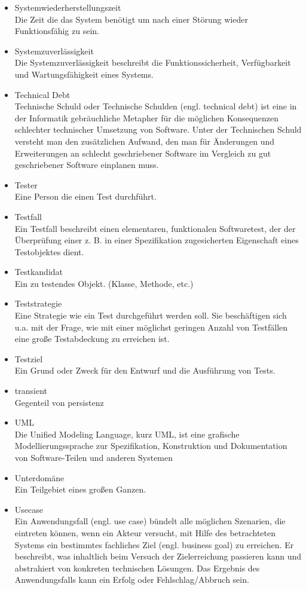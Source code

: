 \begin{itemize}
\item 	Systemwiederherstellungszeit \\  Die Zeit die das System benötigt um nach einer Störung wieder Funktionsfähig zu sein.
\item 	Systemzuverlässigkeit \\Die Systemzuverlässigkeit beschreibt die Funktionssicherheit, Verfügbarkeit und Wartungsfähigkeit eines Systems. 	
\item 	Technical Debt \\ Technische Schuld oder Technische Schulden (engl. technical debt) ist eine in der Informatik gebräuchliche Metapher für die möglichen Konsequenzen schlechter technischer Umsetzung von Software. Unter der Technischen Schuld versteht man den zusätzlichen Aufwand, den man für Änderungen und Erweiterungen an schlecht geschriebener Software im Vergleich zu gut geschriebener Software einplanen muss.
\item 	Tester \\ Eine Person die einen Test durchführt.
\item 	Testfall \\ Ein Testfall beschreibt einen elementaren, funktionalen Softwaretest, der der Überprüfung einer z. B. in einer Spezifikation zugesicherten Eigenschaft eines Testobjektes dient. 
\item 	Testkandidat \\ Ein zu testendes Objekt. (Klasse, Methode, etc.)
\item 	Teststrategie \\ Eine Strategie wie ein Test durchgeführt werden soll. Sie beschäftigen sich u.a. mit der Frage, wie mit einer möglichst geringen Anzahl von Testfällen eine große Testabdeckung zu erreichen ist.
\item 	Testziel \\ Ein Grund oder Zweck für den Entwurf und die Ausführung von Tests.
\item 	transient \\ Gegenteil von persistenz
\item 	UML \\ Die Unified Modeling Language, kurz UML, ist eine grafische Modellierungssprache zur Spezifikation, Konstruktion und Dokumentation von Software-Teilen und anderen Systemen
\item 	Unterdomäne \\ Ein Teilgebiet eines großen Ganzen.
\item 	Usecase \\ Ein Anwendungsfall (engl. use case) bündelt alle möglichen Szenarien, die eintreten können, wenn ein Akteur versucht, mit Hilfe des betrachteten Systems ein bestimmtes fachliches Ziel (engl. business goal) zu erreichen. Er beschreibt, was inhaltlich beim Versuch der Zielerreichung passieren kann und abstrahiert von konkreten technischen Lösungen. Das Ergebnis des Anwendungsfalls kann ein Erfolg oder Fehlschlag/Abbruch sein.

\end{itemize}
